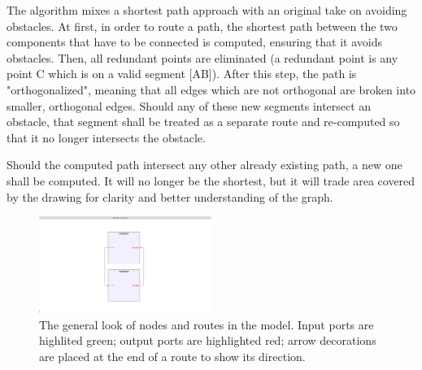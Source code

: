 The algorithm mixes a shortest path approach with an original take on avoiding obstacles.
At first, in order to route a path, the shortest path between the two components that have 
to be connected is computed, ensuring that it avoids obstacles. Then, all redundant points 
are eliminated (a redundant point is any point C which is on a valid segment [AB]). After 
this step, the path is "orthogonalized", meaning that all edges which are not orthogonal are 
broken into smaller, orthogonal edges. Should any of these new segments intersect an obstacle,
that segment shall be treated as a separate route and re-computed so that it no longer 
intersects the obstacle.

Should the computed path intersect any other already existing path, a new one shall be 
computed. It will no longer be the shortest, but it will trade area covered by the drawing 
for clarity and better understanding of the graph.

\begin{figure}[ht] \centering
\includegraphics[width=0.5\textwidth]{src/modelExample.png}
\caption{The general look of nodes and routes in the model. Input ports are highlited green; output ports are highlighted red; arrow decorations are placed 
at the end of a route to show its direction.} \end{figure}
